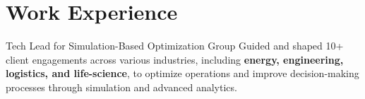 \documentclass[a4paper]{deedy-resume} %
\begin{document}
\section{Work Experience}
\begin{callout}{Tech Lead for Simulation-Based Optimization Group}
    \linebreak
    Guided and shaped 10+ client engagements across various industries,
    including \textbf{energy, engineering, logistics, and life-science}, to optimize operations and improve decision-making processes through simulation and advanced analytics.
\end{callout}
\end{document}
